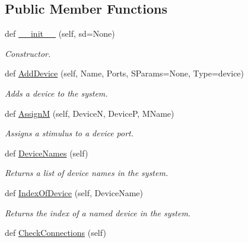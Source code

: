 \subsection*{Public Member Functions}
\begin{DoxyCompactItemize}
\item 
def \hyperlink{classSignalIntegrity_1_1SystemDescriptions_1_1SystemDescription_1_1SystemDescription_a2fa2ae61a4511a760e2d2047ec07eb05}{\+\_\+\+\_\+init\+\_\+\+\_\+} (self, sd=None)
\begin{DoxyCompactList}\small\item\em Constructor. \end{DoxyCompactList}\item 
def \hyperlink{classSignalIntegrity_1_1SystemDescriptions_1_1SystemDescription_1_1SystemDescription_a377579b9eda21744cf7c7b48df997367}{Add\+Device} (self, Name, Ports, S\+Params=None, Type=\textquotesingle{}device\textquotesingle{})
\begin{DoxyCompactList}\small\item\em Adds a device to the system. \end{DoxyCompactList}\item 
def \hyperlink{classSignalIntegrity_1_1SystemDescriptions_1_1SystemDescription_1_1SystemDescription_a9a01e1f7b412557a004a033def08ffbc}{AssignM} (self, DeviceN, DeviceP, M\+Name)
\begin{DoxyCompactList}\small\item\em Assigns a stimulus to a device port. \end{DoxyCompactList}\item 
def \hyperlink{classSignalIntegrity_1_1SystemDescriptions_1_1SystemDescription_1_1SystemDescription_a6e5e0722dbb334bdf62b794cc8bd1314}{Device\+Names} (self)
\begin{DoxyCompactList}\small\item\em Returns a list of device names in the system. \end{DoxyCompactList}\item 
def \hyperlink{classSignalIntegrity_1_1SystemDescriptions_1_1SystemDescription_1_1SystemDescription_a8f829e8e789d1684f55a6a6b40d0460e}{Index\+Of\+Device} (self, Device\+Name)
\begin{DoxyCompactList}\small\item\em Returns the index of a named device in the system. \end{DoxyCompactList}\item 
def \hyperlink{classSignalIntegrity_1_1SystemDescriptions_1_1SystemDescription_1_1SystemDescription_abc6647e2004523ee8d9b8c2bece038a3}{Check\+Connections} (self)

\end{DoxyCompactItemize}

